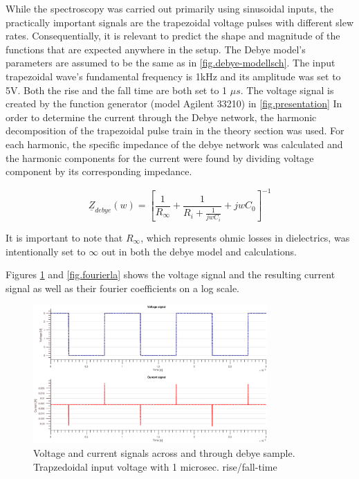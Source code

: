 While the spectroscopy was carried out primarily using sinusoidal inputs,
the practically important signals are the trapezoidal voltage pulses with different
slew rates. Consequentially, it is relevant to predict the shape and magnitude
of the functions that are expected anywhere in the setup. 
The Debye model's parameters are assumed to be the same as in \ref{fig.debye-modellsch}.
The input trapezoidal wave's fundamental frequency is 1kHz and its amplitude was
set to 5V. Both the rise and 
the fall time are both set to 1 $\mu s$. The voltage signal is created
by the function generator (model Agilent 33210) in \ref{fig.presentation}
\newline
In order to determine the current through the Debye network, the harmonic decomposition of
the trapezoidal pulse train in the theory section was used. For each harmonic, the specific
impedance of the debye network was calculated and the harmonic components for the current were found by dividing voltage component by its corresponding impedance.

\begin{equation}
 \underline{Z}_{debye}(w)=\left[\frac{1}{R_{\infty}}+\frac{1}{R_{i}+\frac{1}{jwC_{i}}}+jwC_{0}\right]^{-1}
 \label{debyeimpedance}
\end{equation}

It is important to note that $R_{\infty}$, which represents
ohmic losses in dielectrics, was intentionally set to $\infty$ out in both the debye model and calculations.

Figures \ref{fig.beforeandafter} and \ref{fig.fourierla} shows the voltage signal and the resulting current signal as well as their fourier coefficients on a log scale.

\begin{figure}[h!tb]
\centerline{\includegraphics[width=0.8\textwidth]{figures/Method/signal_simulation/beforeandafter.eps}}
\caption{Voltage and current signals across and through debye sample. Trapzedoidal input voltage with 1 microsec. rise/fall-time}
\label{fig.beforeandafter}
\end{figure}

